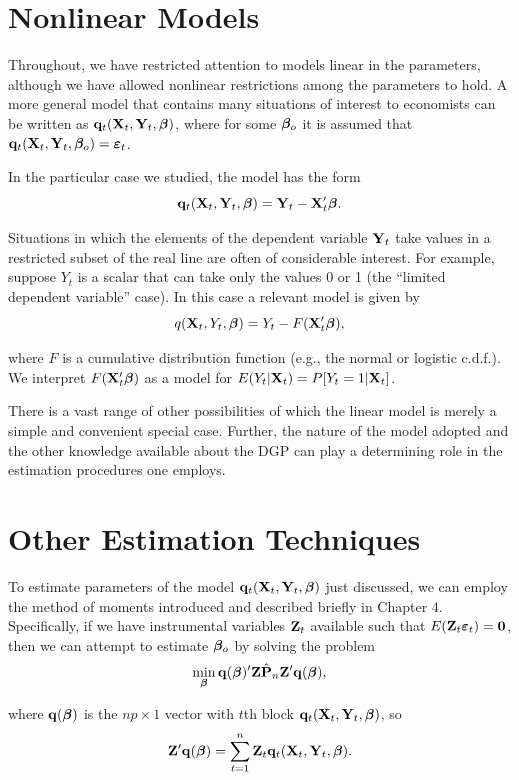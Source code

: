 \section{Nonlinear Models}\label{sec:nonlinear-models}

Throughout, we have restricted attention to models linear in the parameters, although we have allowed nonlinear restrictions among the parameters
to hold. A more general model that contains many situations of interest to
economists can be written as $\mathbf{q}_t(\mathbf{X}_t, \mathbf{Y}_t, \boldsymbol{\beta})$, where for some $\boldsymbol{\beta}_o$ it is assumed
that $\mathbf{q}_t(\mathbf{X}_t, \mathbf{Y}_t, \boldsymbol{\beta}_o) = \boldsymbol{\varepsilon}_t$.

In the particular case we studied, the model has the form
%
\[
  \mathbf{q}_t(\mathbf{X}_t, \mathbf{Y}_t, \boldsymbol{\beta}) = \mathbf{Y}_t - \mathbf{X}_t'\boldsymbol{\beta}.
\]

Situations in which the elements of the dependent variable $\mathbf{Y}_t$ take values
in a restricted subset of the real line are often of considerable interest. For
example, suppose $Y_t$ is a scalar that can take only the values 0 or 1 (the
``limited dependent variable'' case). In this case a relevant model is given
by
%
\[
  q(\mathbf{X}_t, Y_t, \boldsymbol{\beta}) = Y_t - F(\mathbf{X}_t'\boldsymbol{\beta}),
\]

where $F$ is a cumulative distribution function (e.g., the normal or logistic
c.d.f.). We interpret $F(\mathbf{X}_t'\boldsymbol{\beta})$ as a model for $E(Y_t|\mathbf{X}_t) = P[Y_t = 1|\mathbf{X}_t]$.

There is a vast range of other possibilities of which the linear model is
merely a simple and convenient special case. Further, the nature of the
model adopted and the other knowledge available about the DGP can play
a determining role in the estimation procedures one employs.

\section{Other Estimation Techniques}\label{sec:other-estimation}

To estimate parameters of the model $\mathbf{q}_t(\mathbf{X}_t, \mathbf{Y}_t, \boldsymbol{\beta})$ just discussed, we can
employ the method of moments introduced and described briefly in Chapter
4. Specifically, if we have instrumental variables $\mathbf{Z}_t$ available such that
$E(\mathbf{Z}_t \boldsymbol{\varepsilon}_t) = \mathbf{0}$, then we can attempt to estimate $\boldsymbol{\beta}_o$ by solving the problem
%
\[
  \min_{\boldsymbol{\beta}} \mathbf{q}(\boldsymbol{\beta})'\mathbf{Z}\hat{\mathbf{P}}_n\mathbf{Z}'\mathbf{q}(\boldsymbol{\beta}),
\]

where $\mathbf{q}(\boldsymbol{\beta})$ is the $np \times 1$ vector with $t$th block $\mathbf{q}_t(\mathbf{X}_t, \mathbf{Y}_t, \boldsymbol{\beta})$, so
%
\[
  \mathbf{Z}'\mathbf{q}(\boldsymbol{\beta}) = \sum_{t=1}^{n} \mathbf{Z}_t \mathbf{q}_t(\mathbf{X}_t, \mathbf{Y}_t, \boldsymbol{\beta}).
\]

